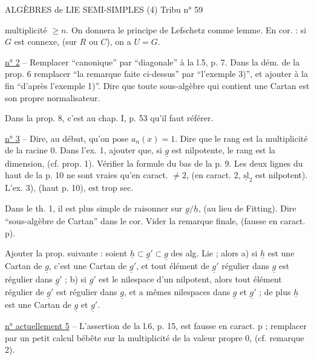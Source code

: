 ALGÈBRES de LIE SEMI-SIMPLES (4) \hfill Tribu n° 59

multiplicité $\geq n$. On donnera le principe de Lefschetz comme lemme. En cor. : si $G$ est connexe, (sur $R$ ou $C$), on a $U=G$.

\uline{n° 2} -- Remplacer ``canonique'' par ``diagonale'' à la l.5, p. 7. Dans la dém. de la prop. 6 remplacer ``la remarque faite ci-dessus'' par ``l'exemple 3)'', et ajouter à la fin ``d'après l'exemple 1)''. Dire que toute sous-algèbre qui contient une Cartan est son propre normalisateur.

Dans la prop. 8, c'est au chap. I, p. 53 qu'il faut référer.

\uline{n° 3} -- Dire, au début, qu'on pose $a_n(x)=1$. Dire que le rang est la multiplicité de la racine 0. Dans l'ex. 1, ajouter que, si $\underline g$ est nilpotente, le rang est la dimension, (cf. prop. 1). Vérifier la formule du bas de la p. 9. Les deux lignes du haut de la p. 10 ne sont vraies qu'en caract. $\ne 2$, (en caract. 2, $\underline{\mathrm{sl}}_2$ est nilpotent). L'ex. 3), (haut p. 10), est trop sec.

Dans le th. 1, il est plus simple de raisonner sur $\underline g/\underline h$, (au lieu de Fitting). Dire ``sous-algèbre de Cartan'' dans le cor. Vider la remarque finale, (fausse en caract. p).

Ajouter la prop. suivante : soient $\underline h\subset\underline g'\subset\underline g$ des alg. Lie ; alors a) si $\underline h$ est une Cartan de $\underline g$, c'est une Cartan de $\underline g'$, et tout élément de $\underline g'$ régulier dans $\underline g$ est régulier dans $\underline g'$ ; b) si $\underline g'$ est le nilespace d'un nilpotent, alors tout élément régulier de $\underline g'$ est régulier dans $\underline g$, et a mêmes nilespaces dans $\underline g$ et $\underline g'$ ; de plus $\underline h$ est une Cartan de $\underline g$ et $\underline g'$.

\uline{n° actuellement 5} -- L'assertion de la l.6, p. 15, est fausse en caract. p ; remplacer par un petit calcul bébête sur la multiplicité de la valeur propre 0, (cf. remarque 2).
